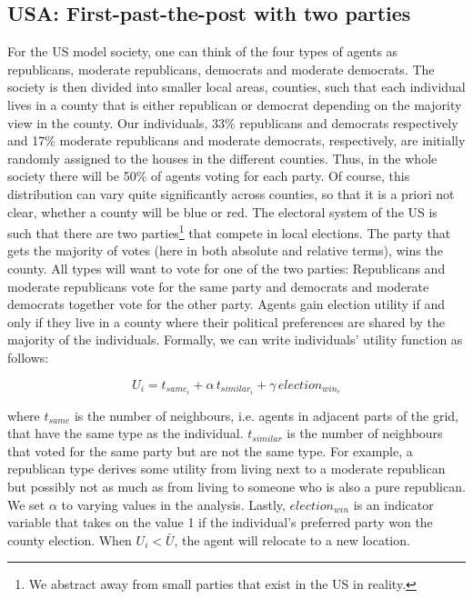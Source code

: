 \documentclass[12pt, a4paper]{article}
\begin{document}
	\subsection{USA: First-past-the-post with two parties}
	For the US model society, one can think of the four types of agents as republicans, moderate republicans, democrats and moderate democrats. The society is then divided into smaller local areas, counties, such that each individual lives in a county that is either republican or democrat depending on the majority view in the county. Our individuals, 33\% republicans and democrats respectively and 17\% moderate republicans and moderate democrats, respectively, are initially randomly assigned to the houses in the different counties.
	Thus, in the whole society there will be 50\% of agents voting for each party. Of course, this distribution can vary quite significantly across counties, so that it is a priori not clear, whether a county will be blue or red.
	The electoral system of the US is such that there are two parties\footnote{We abstract away from small parties that exist in the US in reality.} that compete in local elections. The party that gets the majority of votes (here in both absolute and relative terms), wins the county. All types will want to vote for one of the two parties: Republicans and moderate republicans vote for the same party and democrats and moderate democrats together vote for the other party. Agents gain election utility if and only if they live in a county where their political preferences are shared by the majority of the individuals. Formally, we can write individuals' utility function as follows:
	
	
	\begin{equation}
	U_i=t_{same_i}+\alpha \, t_{similar_i}+\gamma \, election_{win_c}
	\end{equation}
	
	where $t_{same}$ is the number of neighbours, i.e. agents in adjacent parts of the grid, that have the same type as the individual. $t_{similar}$ is the number of neighbours that voted for the same party but are not the same type. For example, a republican type derives some utility from living next to a moderate republican but possibly not as much as from living to someone who is also a pure republican. We set $\alpha$ to varying values in the analysis. Lastly, $election_{win}$ is an indicator variable that takes on the value 1 if the individual's preferred party won the county election. When $U_i < \bar{U}$, the agent will relocate to a new location.
	
\end{document}
